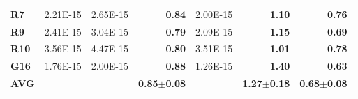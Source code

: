 \documentclass[encoding=utf8,british]{tumphthesis}
\begin{document}
\begin{table}[H]
\begin{subtable}{1.0\textwidth}
{\begin{tabular}{|l|llr|lr|r|}
\textbf{R7}                               & 2.21E-15                                             & 2.65E-15                                              & \textbf{0.84}                                    & 2.00E-15                                                       & \textbf{1.10}                                    & \textbf{0.76}                                            \\
\rowcolor[HTML]{CFE2F3} 
\textbf{R9}                               & 2.41E-15                                             & 3.04E-15                                              & \textbf{0.79}                                    & 2.09E-15                                                       & \textbf{1.15}                                    & \textbf{0.69}                                            \\
\textbf{R10}                              & 3.56E-15                                             & 4.47E-15                                              & \textbf{0.80}                                    & 3.51E-15                                                       & \textbf{1.01}                                    & \textbf{0.78}                                            \\ 
\rowcolor[HTML]{CFE2F3} 
\textbf{G16}                              & 1.76E-15                                             & 2.00E-15                                              & \textbf{0.88}                                    & 1.26E-15                                                       & \textbf{1.40}                                    & \textbf{0.63}                                            \\ \hline
\textbf{AVG}                             &                                                      &                                                       & \textbf{0.85$\pm$0.08}                           &                                                                & \textbf{1.27$\pm$0.18}                           & \textbf{0.68$\pm$0.08}                                  
 \\ \hline
\end{tabular}}
    \end{subtable}
\end{table}
\end{document}

